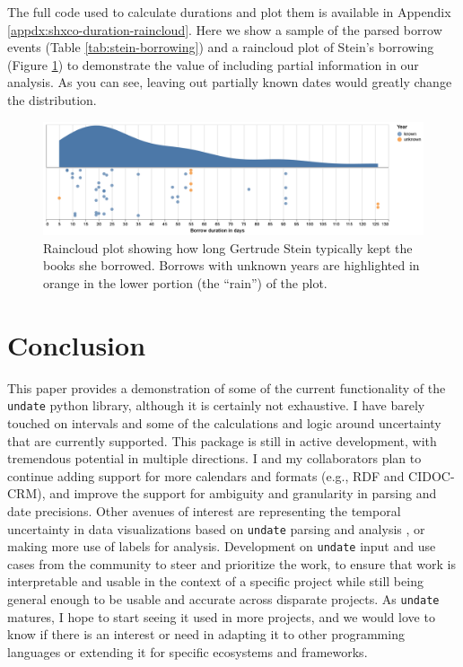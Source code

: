 \documentclass[final]{anthology-ch} %
\begin{document}
The full code used to calculate durations and plot them is available in Appendix \ref{appdx:shxco-duration-raincloud}.  Here we show a sample of the parsed borrow events (Table \ref{tab:stein-borrowing}) and a raincloud plot of Stein's borrowing (Figure \ref{fig:stein-borrow-raincloud}) to demonstrate the value of including partial information in our analysis. As you can see, leaving out partially known dates would greatly change the distribution. 


\begin{figure}[t!]
  \centering
  \includegraphics[width=\linewidth]{figures/shxco_stein_borrows.png}
  \caption{Raincloud plot showing how long Gertrude Stein typically kept the books
she borrowed.  Borrows with unknown years are highlighted in orange in the lower portion (the ``rain'') of the plot. }
  \label{fig:stein-borrow-raincloud}
\end{figure}

\section{Conclusion}

This paper provides a demonstration of some of the current functionality of the \texttt{undate} python library, although it is certainly not exhaustive. I have barely touched on intervals and some of the calculations and logic around uncertainty that are currently supported. This package is still in active development, with tremendous potential in multiple directions. I and my collaborators plan to continue adding support for more calendars and formats (e.g., RDF and CIDOC-CRM), and improve the support for ambiguity and granularity in parsing and date precisions.  Other avenues of interest are representing the temporal uncertainty in data visualizations based on \texttt{undate} parsing and analysis \cite{yau_visualizing_2018}, or making more use of labels for analysis. Development on \texttt{undate} input and use cases from the community to steer and prioritize the work, to ensure that work is interpretable and usable in the context of a specific project while still being general enough to be usable and accurate across disparate projects.  As \texttt{undate} matures, I hope to start seeing it used in more projects, and we would love to know if there is an interest or need in adapting it to other programming languages or extending it for specific ecosystems and frameworks.
\end{document}
